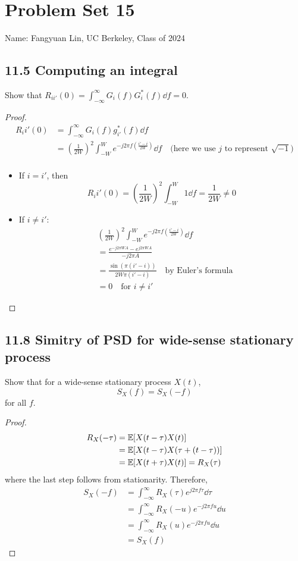 \documentclass[../main.tex]{subfiles}
\begin{document}
\section*{Problem Set 15}
    Name: Fangyuan Lin, UC Berkeley, Class of 2024

\subsection*{11.5 Computing an integral}
Show that $R_{ii'}(0)=\int_{-\infty}^\infty G_i(f)G^*_i(f)\dd f = 0$.
\begin{proof}
    \begin{align*}
        R_ii'(0) &= \int_{-\infty}^\infty G_i(f)g_{i'}^*(f)\dd f\\
        &=\left(\frac{1}{2W}\right)^2\int_{-W}^W e^{-j2\pi f\left(\frac{i'-i}{2W}\right)}\dd f \quad\text{(here we use $j$ to represent $\sqrt{-1}$)}\\
    \end{align*}
    \begin{itemize}
        \item If $i=i'$, then \[
        R_ii'(0)=\left(\frac{1}{2W}\right)^2\int_{-W}^W 1 \dd f=\frac{1}{2W} \neq 0
        \]
        \item If $i\neq i'$: \begin{align*}
            &\left(\frac{1}{2W}\right)^2\int_{-W}^W e^{-j2\pi f\left(\frac{i'-i}{2W}\right)}\dd f\\
            &= \frac{e^{-j 2\pi W A} - e^{j 2\pi W A}}{-j 2\pi A}\\
            &= \frac{\sin\left(\pi (i' - i)\right)}{2W \pi (i' - i)} \quad \text{by Euler's formula}\\
            &= 0 \quad\text{for $i\neq i'$}
        \end{align*}
    \end{itemize}
\end{proof}
\subsection*{11.8 Simitry of PSD for wide-sense stationary process}
Show that for a wide-sense stationary process $X(t)$,
\[
S_X(f) = S_X(-f)
\] for all $f$.
\begin{proof}
    \begin{align*}
        R_X(-\tau) &= \mathbb{E} [X(t-\tau)X(t)]\\
        &= \mathbb{E}[X(t-\tau)X(\tau + (t-\tau))]\\
        &= \mathbb{E} [X(t+\tau) X(t)] = R_X(\tau)
    \end{align*}
    where the last step follows from stationarity.
    \newline
    Therefore,
    \begin{align*}
        S_X(-f) &= \int_{-\infty}^\infty R_X(\tau) e^{j2\pi f\tau} \dd \tau \\
        &=\int_{-\infty}^\infty R_X(-u) e^{-j2\pi fu} \dd u\\
        &=\int_{-\infty}^\infty R_X(u) e^{-j2\pi fu} \dd u\\
        &= S_X(f)
    \end{align*}
\end{proof}
\end{document}
